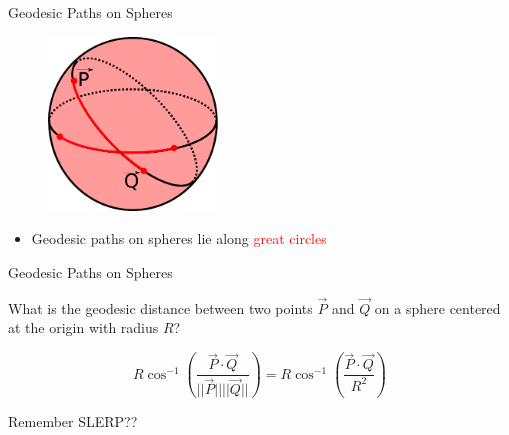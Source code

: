 \documentclass{beamer}
\begin{document}
\begin{frame}{Geodesic Paths on Spheres}
\begin{figure}[t]
    \includegraphics[width=0.4\textwidth]{SphereGeodesic2.pdf}
\end{figure}


\begin{itemize}[label=$\vartriangleright$]
\item Geodesic paths on spheres lie along \textcolor{red}{great circles}



\end{itemize}

\end{frame}

\begin{frame}{Geodesic Paths on Spheres}

What is the geodesic distance between two points $\vec{P}$ and $\vec{Q}$ on a sphere centered at the origin with radius $R$?

\[ R \cos^{-1} \left( \frac{\vec{P} \cdot \vec{Q}}{||\vec{P}|| ||\vec{Q}||} \right) = R \cos^{-1}\left( \frac{\vec{P} \cdot \vec{Q}}{R^2} \right) \]

Remember SLERP??

\end{frame}
\end{document}
